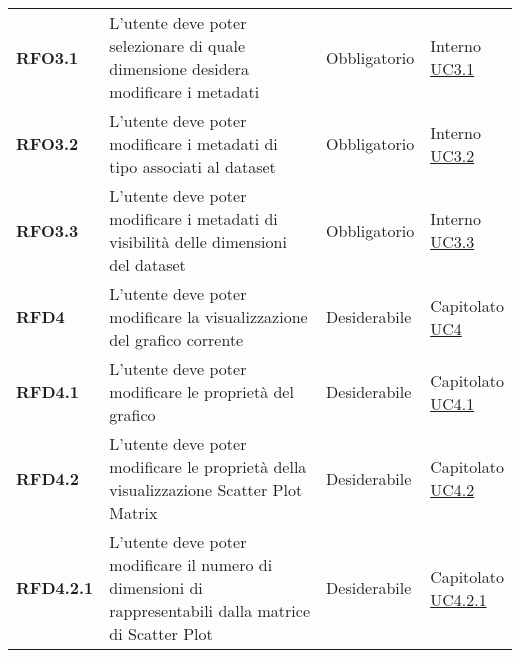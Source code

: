 \begin{longtable}[H]{| >{\raggedright\bfseries}m{20mm} | >{\raggedright}m{90mm} | >{\centering}m{25mm} | >{\centering\arraybackslash}m{30mm}|}
    RFO3.1
     & L'utente deve poter selezionare di quale dimensione desidera modificare i metadati
     & Obbligatorio
     & \makecell{ Interno                                                                                                \\\hyperref[ssub:uc3.1]{UC3.1} }\\

    RFO3.2
     & L'utente deve poter modificare i metadati di tipo associati al dataset
     & Obbligatorio
     & \makecell{ Interno                                                                                                \\\hyperref[ssub:uc3.2]{UC3.2} }\\

    RFO3.3
     & L'utente deve poter modificare i metadati di visibilità delle dimensioni del dataset
     & Obbligatorio
     & \makecell{ Interno                                                                                                \\  \hyperref[ssub:uc3.3]{UC3.3} }\\

    RFD4
     & L'utente deve poter modificare la visualizzazione del grafico corrente
     & Desiderabile
     & \makecell{ Capitolato                                                                                             \\ \hyperref[sub:uc4]{UC4} }\\

    RFD4.1
     & L'utente deve poter modificare le proprietà del grafico
     & Desiderabile
     & \makecell{ Capitolato                                                                                             \\ \hyperref[ssub:uc4.1]{UC4.1} }\\

    RFD4.2
     & L'utente deve poter modificare le proprietà della visualizzazione Scatter Plot Matrix
     & Desiderabile
     & \makecell{ Capitolato                                                                                             \\ \hyperref[ssub:uc4.2]{UC4.2} }\\

    RFD4.2.1
     & L'utente deve poter modificare il numero di dimensioni di rappresentabili dalla matrice di Scatter Plot
     & Desiderabile
     & \makecell{ Capitolato                                                                                             \\ \hyperref[par:uc4.2.1]{UC4.2.1} }\\


\end{longtable}
